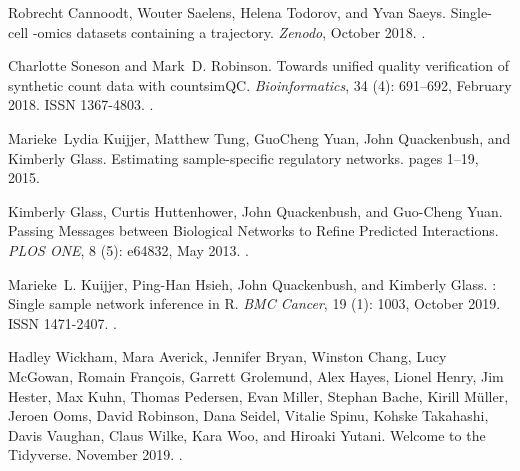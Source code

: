 \documentclass[10pt, a4paper]{article}
\begin{document}
\begin{thebibliography}{59}
	Robrecht Cannoodt, Wouter Saelens, Helena Todorov, and Yvan Saeys.
	\newblock Single-cell -omics datasets containing a trajectory.
	\newblock \emph{Zenodo}, October 2018.
	\newblock {}.
	
	Charlotte Soneson and Mark~D. Robinson.
	\newblock Towards unified quality verification of synthetic count data with
	{{countsimQC}}.
	\newblock \emph{Bioinformatics}, 34 (4): 691--692, February
	2018{}.
	\newblock ISSN 1367-4803.
	\newblock {}.
	
	Marieke~Lydia Kuijjer, Matthew Tung, GuoCheng Yuan, John Quackenbush, and
	Kimberly Glass.
	\newblock Estimating sample-specific regulatory networks.
	\newblock pages 1--19, 2015.
	
	Kimberly Glass, Curtis Huttenhower, John Quackenbush, and Guo-Cheng Yuan.
	\newblock Passing {{Messages}} between {{Biological Networks}} to {{Refine
			Predicted Interactions}}.
	\newblock \emph{PLOS ONE}, 8 (5): e64832, May 2013.
	\newblock {}.
	
	Marieke~L. Kuijjer, Ping-Han Hsieh, John Quackenbush, and Kimberly Glass.
	: Single sample network inference in {{R}}.
	\newblock \emph{BMC Cancer}, 19 (1): 1003, October
	2019{}.
	\newblock ISSN 1471-2407.
	\newblock {}.
	
	Hadley Wickham, Mara Averick, Jennifer Bryan, Winston Chang, Lucy McGowan,
	Romain Fran{\c c}ois, Garrett Grolemund, Alex Hayes, Lionel Henry, Jim
	Hester, Max Kuhn, Thomas Pedersen, Evan Miller, Stephan Bache, Kirill
	M{\"u}ller, Jeroen Ooms, David Robinson, Dana Seidel, Vitalie Spinu, Kohske
	Takahashi, Davis Vaughan, Claus Wilke, Kara Woo, and Hiroaki Yutani.
	\newblock Welcome to the {{Tidyverse}}.
	\newblock November 2019.
	\newblock {}.
	

\end{thebibliography}
\end{document}
